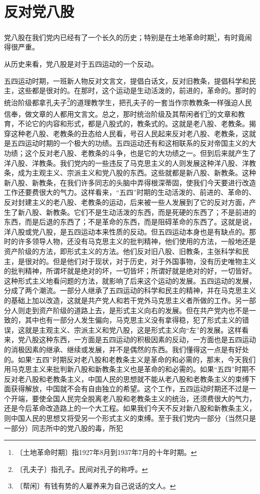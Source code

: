 \documentclass[12pt,UTF-8,openany]{ctexbook}
\begin{document}
\chapter{反对党八股}

\begin{large}
    
    党八股在我们党内已经有了一个长久的历史；特别是在土地革命时期\footnote{〔土地革命时期〕指1927年8月到1937年7月的十年时期。}，有时竟闹得很严重。
    
    从历史来看，党八股是对于五四运动的一个反动。
    
    五四运动时期，一班新人物反对文言文，提倡白话文，反对旧教条，提倡科学和民主，这些都是很对的。在那时，这个运动是生动活泼的，前进的，革命的。那时的统治阶级都拿孔夫子\footnote{〔孔夫子〕指孔子。民间对孔子的称呼。}的道理教学生，把孔夫子的一套当作宗教教条一样强迫人民信奉，做文章的人都用文言文。总之，那时统治阶级及其帮闲者们\footnote{〔帮闲〕有钱有势的人雇养来为自己说话的文人。}的文章和教育，不论它的内容和形式，都是八股式的，教条式的。这就是老八股、老教条。揭穿这种老八股、老教条的丑态给人民看，号召人民起来反对老八股、老教条，这就是五四运动时期的一个极大的功绩。五四运动还有和这相联系的反对帝国主义的大功绩；这个反对老八股、老教条的斗争，也是它的大功绩之一。但到后来就产生了洋八股、洋教条。我们党内的一些违反了马克思主义的人则发展这种洋八股、洋教条，成为主观主义、宗派主义和党八股的东西。这些就都是新八股、新教条。这种新八股、新教条，在我们许多同志的头脑中弄得根深蒂固，使我们今天要进行改造工作还要费很大的气力。这样看来，“五四”时期的生动活泼的、前进的、革命的、反对封建主义的老八股、老教条的运动，后来被一些人发展到了它的反对方面，产生了新八股、新教条。它们不是生动活泼的东西，而是死硬的东西了；不是前进的东西，而是后退的东西了；不是革命的东西，而是阻碍革命的东西了。这就是说，洋八股或党八股，是五四运动本来性质的反动。但五四运动本身也是有缺点的。那时的许多领导人物，还没有马克思主义的批判精神，他们使用的方法，一般地还是资产阶级的方法，即形式主义的方法。他们反对旧八股、旧教条，主张科学和民主，是很对的。但是他们对于现状，对于历史，对于外国事物，没有历史唯物主义的批判精神，所谓坏就是绝对的坏，一切皆坏；所谓好就是绝对的好，一切皆好。这种形式主义地看问题的方法，就影响了后来这个运动的发展。五四运动的发展，分成了两个潮流。一部分人继承了五四运动的科学和民主的精神，并在马克思主义的基础上加以改造，这就是共产党人和若干党外马克思主义者所做的工作。另一部分人则走到资产阶级的道路上去，是形式主义向右的发展。但在共产党内也不是一致的，其中也有一部分人发生偏向，马克思主义没有拿得稳，犯了形式主义的错误，这就是主观主义、宗派主义和党八股，这是形式主义向“左”的发展。这样看来，党八股这种东西，一方面是五四运动的积极因素的反动，一方面也是五四运动的消极因素的继承、继续或发展，并不是偶然的东西。我们懂得这一点是有好处的。如果“五四”时期反对老八股和老教条主义是革命的和必需的，那末，今天我们用马克思主义来批判新八股和新教条主义也是革命的和必需的。如果“五四”时期不反对老八股和老教条主义，中国人民的思想就不能从老八股和老教条主义的束缚下面获得解放，中国就不会有自由独立的希望。这个工作，五四运动时期还不过是一个开端，要使全国人民完全脱离老八股和老教条主义的统治，还须费很大的气力，还是今后革命改造路上的一个大工程。如果我们今天不反对新八股和新教条主义，则中国人民的思想又将受另一个形式主义的束缚。至于我们党内一部分（当然只是一部分）同志所中的党八股的毒，所犯
\end{large}
\end{document}

